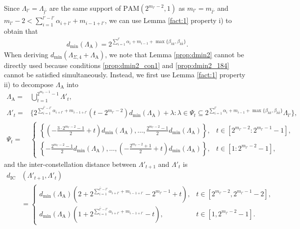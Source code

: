 \documentclass[12pt, draftclsnofoot, onecolumn]{IEEEtran}
\theoremstyle{definition}
\begin{document}
Since $\Lambda_{l'} = \Lambda_{\bar{l'}}$ are the same support of $\text{PAM}(2^{m_{l'}-2},1)$ as $m_{l'} = m_{\bar{l'}}$ and $m_{l'}-2<\sum_{i=1}^{\bar{l'}-l'}\alpha_{i+l'}+m_{i-1+l'}$, we can use Lemma \ref{fact:1} property i) to obtain that
\begin{align}\label{eq:dmin_CA}
d_{\min}(\Lambda_\text{A}) = 2^{\sum_{i=1}^{l'}\alpha_i+m_{i-1}+\max\{\beta_{kk},\beta_{k\bar{k}}\}}.
\end{align}
When deriving $d_{\min}(\Lambda_{\Sigma,4}+\Lambda_\text{A})$, we note that Lemma \ref{prop:dmin2} cannot be directly used because conditions \eqref{prop:dmin2_con1} and \eqref{prop:dmin2_184} cannot be satisfied simultaneously. Instead, we first use Lemma \ref{fact:1} property ii) to decompose $\Lambda_\text{A}$ into
\begin{align}\label{eq:break_CA_1}
\Lambda_\text{A}=& \bigcup_{t=1}^{2^{m_{l'}-1}-1}\Lambda'_t,\\
\Lambda'_t =&\{2^{\sum_{i=1}^{\bar{l'}-l'}\alpha_{i+l'}+m_{i-1+l'}}(t-2^{m_{l'}-2})d_{\min}(\Lambda_\text{A})+\lambda:\lambda \in \Psi_t \subseteq 2^{\sum_{i=1}^{l'}\alpha_i+m_{i-1}+\max\{\beta_{kk},\beta_{k\bar{k}}\}}\Lambda_{l'}\}, \label{eq:lambdat_pop4}\\
\Psi_t=&\left\{\begin{array}{ll}\left\{\left(-\frac{3\cdot2^{m_{l'}-2}-1}{2}+t\right)d_{\min}(\Lambda_\text{A}),\ldots,\frac{2^{m_{l'}-2}-1}{2}d_{\min}(\Lambda_\text{A})\right\},&t\in [2^{m_{l'}-2}:2^{m_{l'}-1}-1],\\
\left\{-\frac{2^{m_{l'}-2}-1}{2}d_{\min}(\Lambda_\text{A}),\ldots,\left(-\frac{2^{m_{l'}-2}+1}{2}+t\right)d_{\min}(\Lambda_\text{A})\right\},&t \in[1 :2^{m_{l'}-2}-1],
\end{array}\right.
\end{align}
and the inter-constellation distance between $\Lambda'_{t+1}$ and $\Lambda'_{t}$ is
\begin{align}\label{eq:edge_for_use}
d_{\text{IC}}&(\Lambda'_{t+1},\Lambda'_{t})   \nonumber\\
&=\left\{\begin{array}{ll} d_{\min}(\Lambda_\text{A})(2+2^{\sum_{i=1}^{\bar{l'}-l'}\alpha_{i+l'}+m_{i-1+l'}}-2^{m_{l'}-1}+t),& t \in [2^{m_{l'}-2},2^{m_{l'}-1}-2], \\
d_{\min}(\Lambda_\text{A})(1+2^{\sum_{i=1}^{\bar{l'}-l'}\alpha_{i+l'}+m_{i-1+l'}}-t), &t\in [1,2^{m_{l'}-2}-1].
\end{array}\right.
\end{align}
\end{document}
